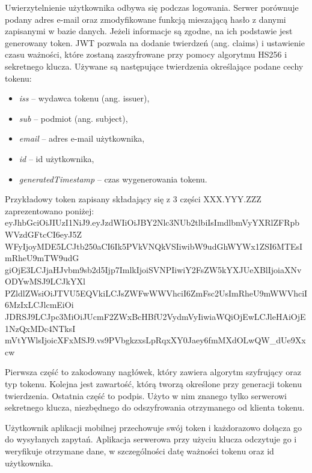 \documentclass[10pt,twoside,a4paper]{report}
\begin{document}
\par Uwierzytelnienie użytkownika odbywa się podczas logowania. Serwer porównuje podany adres e-mail oraz zmodyfikowane funkcją mieszającą hasło z danymi zapisanymi w bazie danych. Jeżeli informacje są zgodne, na ich podstawie jest generowany token. JWT pozwala na dodanie twierdzeń (ang. claims) i ustawienie czasu ważności, które zostaną zaszyfrowane przy pomocy algorytmu HS256 i sekretnego klucza. Używane są następujące twierdzenia określające podane cechy tokenu:
\begin{itemize}
\item \textit{iss} -- wydawca tokenu (ang. issuer),
\item \textit{sub} -- podmiot (ang. subject),
\item \textit{email} -- adres e-mail użytkownika,
\item \textit{id} -- id użytkownika,
\item \textit{generatedTimestamp} -- czas wygenerowania tokenu.
\end{itemize}
\par Przykładowy token zapisany składający się z 3 części XXX.YYY.ZZZ zaprezentowano poniżej:\\eyJhbGciOiJIUzI1NiJ9.eyJzdWIiOiJBY2Nlc3NUb2tlbiIsImdlbmVyYXRlZFRpbWVzdGFtcCI6eyJ5Z\\WFyIjoyMDE5LCJtb250aCI6Ik5PVkVNQkVSIiwibW9udGhWYWx1ZSI6MTEsImRheU9mTW9udG\\
giOjE3LCJjaHJvbm9sb2d5Ijp7ImlkIjoiSVNPIiwiY2FsZW5kYXJUeXBlIjoiaXNvODYwMSJ9LCJkYXl\\
PZldlZWsiOiJTVU5EQVkiLCJsZWFwWWVhciI6ZmFsc2UsImRheU9mWWVhciI6MzIxLCJlcmEiOi\\
JDRSJ9LCJpc3MiOiJUcmF2ZWxBcHBfU2VydmVyIiwiaWQiOjEwLCJleHAiOjE1NzQxMDc4NTksI\\mVtYWlsIjoicXFxMSJ9.vs9PVbgkzxsLpRqxXY0Jaey6fmMXdOLwQW\_dUe9Xxcw

\par Pierwsza część to zakodowany nagłówek, który zawiera algorytm szyfrujący oraz typ tokenu. 
Kolejna jest zawartość, którą tworzą określone przy generacji tokenu twierdzenia. Ostatnia część to podpis. Użyto w nim znanego tylko serwerowi sekretnego klucza, niezbędnego do odszyfrowania otrzymanego od klienta tokenu.
\par Użytkownik aplikacji mobilnej przechowuje swój token i każdorazowo dołącza go do wysyłanych zapytań. Aplikacja serwerowa przy użyciu klucza odczytuje go i weryfikuje otrzymane dane, w szczególności datę ważności tokenu oraz id użytkownika.
\end{document}
